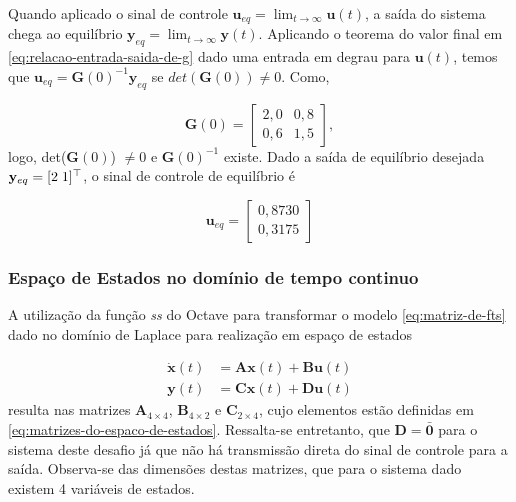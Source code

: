 Quando aplicado o sinal de controle $\mathbf{u}_{eq} = \lim_{t \rightarrow
        \infty }\mathbf{u}(t)$, a saída do sistema chega ao equilíbrio $\mathbf{y}_{eq}
    = \lim_{t \rightarrow \infty }\mathbf{y}(t)$. Aplicando o teorema do valor
final em \ref{eq:relacao-entrada-saida-de-g} dado uma entrada em degrau para
$\mathbf{u}(t)$, temos que $\mathbf{u}_{eq} = \mathbf{G}(0)^{-1}\mathbf{y}_{eq}$
se $det(\mathbf{G}(0)) \neq 0$. Como,

\begin{equation}
    \label{eq:ganho-estatico-de-g}
    \mathbf{G}(0)
    =
    \begin{bmatrix}
        2,0 & 0,8 \\
        0,6 & 1,5
    \end{bmatrix},
\end{equation}logo, det($\mathbf{G}(0)$) $\neq 0$ e $\mathbf{G}(0)^{-1}$ existe.
Dado a saída de equilíbrio desejada $\mathbf{y}_{eq} = [2 \thickspace 1]^\top$,
o sinal de controle de equilíbrio é

\begin{equation}
    \label{eq:vetor-do-controle-de-equilibrio}
    \mathbf{u}_{eq} =
    \begin{bmatrix}
        0,8730 \\
        0,3175
    \end{bmatrix}
\end{equation}

\subsubsection{Espaço de Estados no domínio de tempo continuo}
\label{subsub:espaco-de-estados-no-dominio-de-tempo-continuo}

A utilização da função \textit{ss} do Octave para transformar o modelo
\ref{eq:matriz-de-fts} dado no domínio de Laplace para realização em espaço de
estados

\begin{subequations}
    \label{eq:espaco-de-estados-continuo}
    \begin{align}
        \mathbf{\dot{x}}(t) & = \mathbf{A}\mathbf{x}(t) + \mathbf{B}\mathbf{u}(t)
        \label{eq:derivada-do-vetor-de-estados}                                   \\
        \mathbf{y}(t)       & = \mathbf{C}\mathbf{x}(t) + \mathbf{D}\mathbf{u}(t)
        \label{eq:saida-do-sistema-em-espaco-de-estados}
    \end{align}
\end{subequations} resulta nas matrizes $\mathbf{A}_{4\times 4}$,
$\mathbf{B}_{4\times 2}$ e $\mathbf{C}_{2\times 4}$, cujo elementos estão
definidas em \ref{eq:matrizes-do-espaco-de-estados}. Ressalta-se entretanto, que
$\mathbf{D} = \mathbf{\bar{0}}$ para o sistema deste desafio já que não há
transmissão direta do sinal de controle para a saída. Observa-se das dimensões
destas matrizes, que para o sistema dado existem 4 variáveis de estados.

